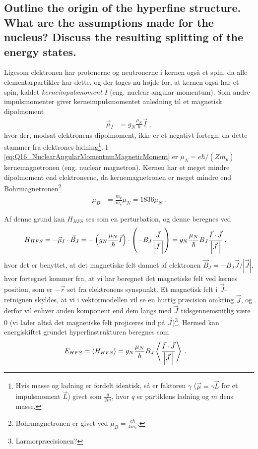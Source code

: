 \subsection{Outline the origin of the hyperfine structure. What are the assumptions made for the nucleus? Discuss the resulting splitting of the energy states.}


Ligesom elektronen har protonerne og neutronerne i kernen også et spin, da alle elementarpartikler har dette, og der tages nu højde for, at kernen også har et spin, kaldet \emph{kerneimpulsmoment} $I$ (eng. nuclear angular momentum). Som andre impulsmomenter giver kerneimpulsmomentet anledning til et magnetisk dipolmoment
\begin{align} \label{eq:Q16_NuclearAngularMomentumMagneticMoment}
	\vec{\mu}_I &= g_N \frac{\mu_N}{\hbar} \vec{I} \: ,
\end{align}
hvor der, modsat elektronens dipolmoment, ikke er et negativt fortegn, da dette stammer fra elektrones ladning\footnote{Hvis masse og ladning er fordelt identisk, så er faktoren $\gamma$ ($\vec{\mu} = \gamma \vec{L}$ for et impulsmoment $\vec{L}$) givet som $\frac{q}{2m}$, hvor $q$ er partiklens ladning og $m$ dens masse.}. I \cref{eq:Q16_NuclearAngularMomentumMagneticMoment} er $\mu_N = e\hbar/(Zm_p)$ kernemagnetronen (eng. nuclear magnetron). Kernen har et meget mindre dipolmoment end elektronerne, da kernemagnetronen er meget mindre end Bohrmagnetronen\footnote{Bohrmagnetronen er givet ved $\mu_B = \frac{e\hbar}{4m_e}$.}
\begin{align}
	\mu_B &= \frac{m_p}{m_e}\mu_N = 1836 \mu_N \: .
\end{align}

Af denne grund kan $H_{HFS}$ ses som en perturbation, og denne beregnes ved
\begin{align} \label{eq:Q16_HyperFineStructureHamiltonStart}
	H_{HFS} &= -\vec{\mu}_I \cdot \vec{B}_J
	= -\left(g_N \frac{\mu_N}{\hbar} \vec{I}\right) \cdot \left(-B_J \frac{\vec{J}}{\abs{\vec{J} \: }}\right)
	= g_N \frac{\mu_N}{\hbar} B_J \frac{\vec{I} \cdot \vec{J}}{\abs{\vec{J} \: }} \: ,
\end{align}
hvor det er benyttet, at det magnetiske felt dannet af elektronen $\vec{B}_J = - B_J \vec{J}/|\vec{J}|$, hvor fortegnet kommer fra, at vi har beregnet det magnetiske felt ved kernes position, som er $-\vec{r}$ set fra elektronens synspunkt. Et magnetisk felt i $\vec{J}$-retnignen skyldes, at vi i vektormodellen vil se en hurtig præcision omkring $\vec{J}$, og derfor vil enhver anden komponent end dem langs med $\vec{J}$ tidsgennemsnitlig være $0$ (vi lader altså det magnetiske felt projiceres ind på $\vec{J}$)\footnote{Larmorpræcisionen?}. Hermed kan energiskiftet grundet hyperfinstrukturen beregnes som
\begin{align} \label{eq:Q16_HyperFineStructureEnergyChangeStart}
    E_{HFS} &= \Braket{H_{HFS}} = g_N \frac{\mu_N}{\hbar} B_J \Braket{\frac{\vec{I} \cdot \vec{J}}{\abs{\vec{J} \: }}} \: .
\end{align}

